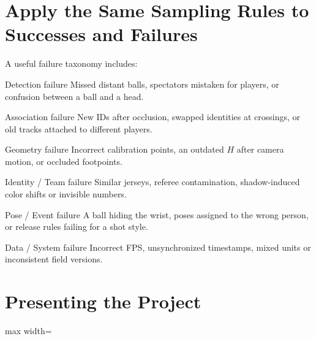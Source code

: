 \documentclass[11pt,a4paper,oneside]{report}
\begin{document}
\section{Apply the Same Sampling Rules to Successes and Failures}

A useful failure taxonomy includes:

\begin{tcbraster}[raster columns=2,raster equal height=rows,raster column skip=7pt,raster row skip=7pt]
\begin{termBox}{Detection failure}
Missed distant balls, spectators mistaken for players, or confusion between a ball and a head.
\end{termBox}
\begin{termBox}{Association failure}
New IDs after occlusion, swapped identities at crossings, or old tracks attached to different players.
\end{termBox}
\begin{termBox}{Geometry failure}
Incorrect calibration points, an outdated $H$ after camera motion, or occluded footpoints.
\end{termBox}
\begin{termBox}{Identity / Team failure}
Similar jerseys, referee contamination, shadow-induced color shifts or invisible numbers.
\end{termBox}
\begin{termBox}{Pose / Event failure}
A ball hiding the wrist, poses assigned to the wrong person, or release rules failing for a shot style.
\end{termBox}
\begin{termBox}{Data / System failure}
Incorrect FPS, unsynchronized timestamps, mixed units or inconsistent field versions.
\end{termBox}
\end{tcbraster}

\section{Presenting the Project}

\begin{center}
\begin{adjustbox}{max width=\linewidth}
\end{adjustbox}
\end{center}
\end{document}
